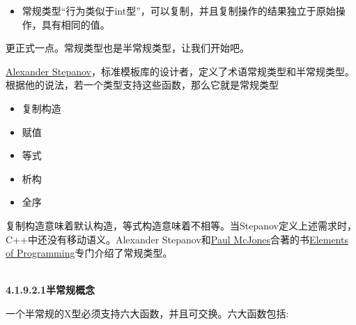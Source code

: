 \begin{itemize}
\item 
常规类型“行为类似于int型”，可以复制，并且复制操作的结果独立于原始操作，具有相同的值。
\end{itemize}

更正式一点。常规类型也是半常规类型，让我们开始吧。


\begin{tcolorbox}[breakable,enhanced jigsaw,colback=blue!5!white,colframe=blue!75!black,title={常规类型}]

\href{https://en.wikipedia.org/wiki/Alexander_Stepanov}{Alexander Stepanov}，标准模板库的设计者，定义了术语常规类型和半常规类型。根据他的说法，若一个类型支持这些函数，那么它就是常规类型

\begin{itemize}
\item 
复制构造

\item 
赋值

\item 
等式

\item 
析构

\item 
全序
\end{itemize}

复制构造意味着默认构造，等式构造意味着不相等。当Stepanov定义上述需求时，C++中还没有移动语义。Alexander Stepanov和\href{https://www.mcjones.org/paul/}{Paul McJones}合著的书\href{http://elementsofprogramming.com/}{Elements of Programming}专门介绍了常规类型。

\end{tcolorbox}

\hspace*{\fill} \\ %
\noindent
\textbf{4.1.9.2.1\hspace{0.2cm}半常规概念}

一个半常规的X型必须支持六大函数，并且可交换。六大函数包括:

